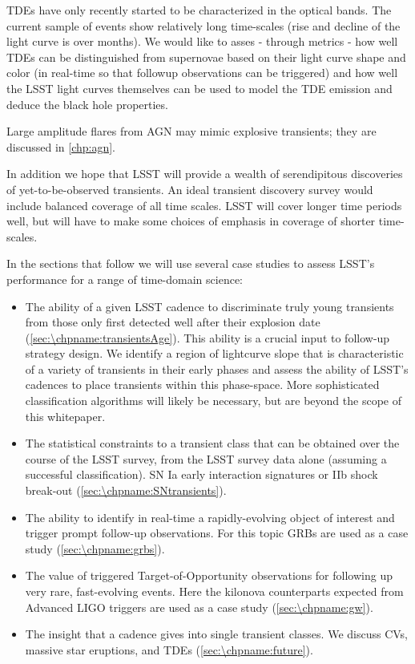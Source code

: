 TDEs have only recently started to be characterized in the optical
bands. The current sample of events show relatively long
time-scales (rise and decline of the light curve is over months). We
would like to asses - through metrics - how well TDEs can be
distinguished from supernovae based on their light curve shape and
color (in real-time so that followup observations can be triggered)
and how well the LSST light curves themselves can be used to model the
TDE emission and deduce the black hole properties.

Large amplitude flares from AGN may mimic
explosive transients; they are discussed in \autoref{chp:agn}.

In addition we hope that LSST will provide a wealth of serendipitous
discoveries of yet-to-be-observed transients.  An ideal transient
discovery survey would include balanced coverage of all time scales. LSST
will cover longer time periods well, but will have to make some
choices of emphasis in coverage of shorter time-scales.

In the sections that follow we will use several case studies to assess
LSST's performance for a range of time-domain science:

\begin{itemize}
\item
  The ability of a given LSST cadence to discriminate truly young
  transients from those only first detected well after their explosion date (\autoref{sec:\chpname:transientsAge}).
  This ability is a crucial input to follow-up strategy design.
  We identify a region of lightcurve slope
  that is characteristic of a
  variety of transients in their early phases and assess the ability of LSST's
  cadences to place transients within this phase-space.
  More sophisticated classification algorithms will likely be necessary, but
  are beyond the scope of this whitepaper.
\item
  The statistical constraints to a transient class that can be obtained
  over the course of the LSST survey, from the LSST survey data alone
  (assuming a successful classification). SN Ia early interaction
  signatures or IIb shock break-out (\autoref{sec:\chpname:SNtransients}).
\item
  The ability to identify in real-time a rapidly-evolving
  object of interest and
  trigger prompt follow-up observations. For this topic GRBs are used as
  a case study (\autoref{sec:\chpname:grbs}).
\item
  The value of triggered Target-of-Opportunity observations for
  following up very rare, fast-evolving events.   Here the kilonova
  counterparts expected from Advanced LIGO triggers are used as a
  case study (\autoref{sec:\chpname:gw}).
\item
  The insight that a cadence gives into single transient classes. We
  discuss CVs, massive star eruptions, and TDEs (\autoref{sec:\chpname:future}).

\end{itemize}


